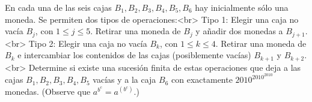 En cada una de las seis cajas $B_1, B_2, B_3, B_4, B_5, B_6$ hay inicialmente sólo una moneda. Se permiten dos tipos de operaciones:<br>
Tipo 1: Elegir una caja no vacía $B_j$, con $1 \leq j \leq 5$. Retirar una moneda de $B_j$ y añadir dos monedas a $B_{j+1}$.<br>
Tipo 2: Elegir una caja no vacía $B_k$, con $1 \leq k \leq 4$. Retirar una moneda de $B_k$ e intercambiar los contenidos de las cajas (posiblemente vacías) $B_{k+1}$ y $B_{k+2}$.<br>
Determine si existe una sucesión finita de estas operaciones que deja a las cajas $B_1,B_2,B_3,B_4,B_5$ vacías y a la caja $B_6$ con exactamente $2010^{2010^{2010}}$ monedas. (Observe que $a^{b^{c}} = a^{(b^c)}$.)